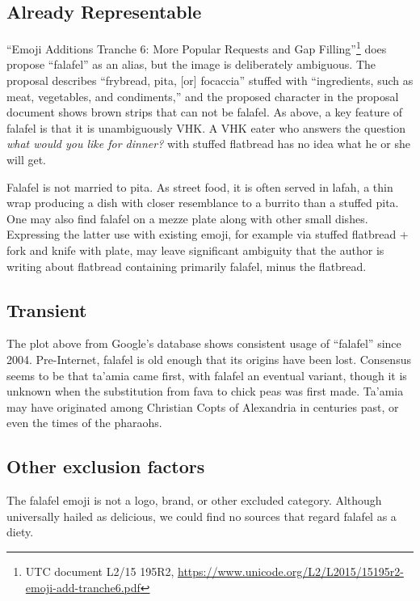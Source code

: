 \documentclass[a4paper,10pt]{article}
\begin{document}
\subsection{Already Representable}

``Emoji Additions Tranche 6: More Popular Requests
and Gap Filling''\footnote{UTC document L2/15 195R2,
\url{https://www.unicode.org/L2/L2015/15195r2-emoji-add-tranche6.pdf}} does propose
``falafel'' as an alias, but the image is deliberately ambiguous. The proposal describes
``frybread, pita, [or] focaccia'' stuffed with ``ingredients, such as meat, vegetables,
and condiments,'' and the proposed character in the proposal document shows brown strips that
can not be falafel.  As above, a key feature of falafel is that it is unambiguously VHK.
A VHK eater who answers the question {\em what would you like for dinner?} with {\sc
stuffed flatbread} has no idea what he or she will get.

Falafel is not married to pita. As street food, it is often served in lafah,
a thin wrap producing a dish with closer resemblance to a burrito than a
stuffed pita. One may also find falafel on a mezze plate along with other small
dishes. Expressing the latter use with existing emoji, for example via {\sc stuffed
flatbread + fork and knife with plate}, may leave significant ambiguity that the author
is writing about flatbread containing primarily falafel, minus the flatbread.

\subsection{Transient}

The plot above from Google's database shows consistent usage of ``falafel'' 
since 2004. Pre-Internet, falafel is old enough that its
origins have been lost. Consensus seems to be that ta'amia came first, with falafel an
eventual variant, though it is unknown when the substitution from fava to chick peas
was first made.  Ta'amia may have originated among Christian Copts of Alexandria in
centuries past, or even the times of the pharaohs.

\subsection{Other exclusion factors}
The {\sc falafel} emoji is not a logo, brand, or other excluded category. Although
universally hailed as delicious, we could find no sources that regard falafel as a diety.
\end{document}
